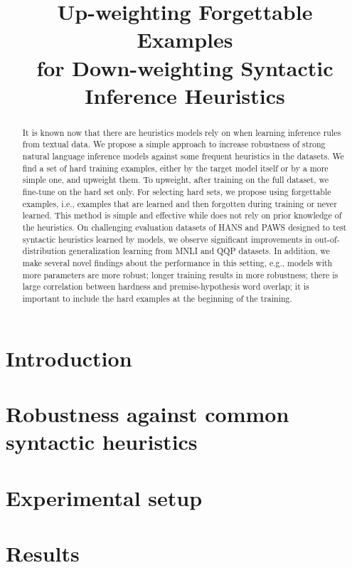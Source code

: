 \documentclass[11pt,a4paper]{article}
\title{Up-weighting Forgettable Examples \\ for Down-weighting
Syntactic Inference Heuristics}
\begin{document}
\maketitle

\begin{abstract}
It is known now that there are heuristics 
models rely on when learning inference rules
from textual data. 
We propose a simple approach to increase robustness of strong natural language inference models against some frequent heuristics in the datasets.
We find a set of hard training examples, either by the target model itself or by a more simple one, and upweight them. 
To upweight, after training on the full dataset, we  fine-tune on the hard set only.
For selecting hard sets, we propose using forgettable
examples, i.e., examples that are learned and then forgotten
during training or never learned. 
This method is simple and effective while does not rely on prior knowledge of
the heuristics. 
On challenging evaluation datasets of HANS and PAWS designed to test syntactic heuristics learned by
models, we observe significant improvements in out-of-distribution generalization learning from
MNLI and QQP  datasets.
In addition, we make several novel findings about the performance in this setting, e.g.,
models with more parameters 
are more robust; longer training
results in more robustness; there is large correlation
between hardness and premise-hypothesis word overlap; it is important to include the hard examples at the beginning of the training.


\end{abstract}

\section{Introduction}



\section{Robustness against common syntactic heuristics}


\section{Experimental setup}
\label{seupt}



\section{Results}
\label{sec:eval}
\end{document}
